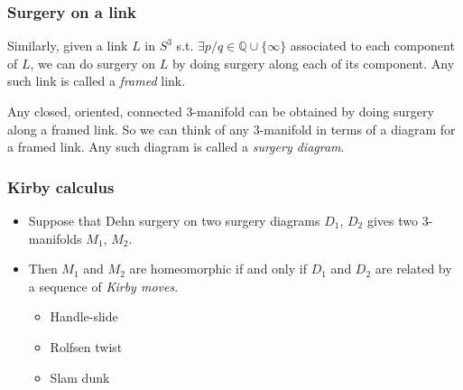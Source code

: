 \documentclass{beamer}
\theoremstyle{ex}
\theoremstyle{rem}
\begin{document}
	

	\begin{frame}
	\frametitle{Surgery on a link}
		\begin{definition}
		Similarly, given a link $L$ in $S^3$ s.t. $\exists p/q \in \mathbb{Q}\cup\{\infty\}$ associated to each component of $L$, we can do surgery on $L$ by doing surgery along each of its component. Any such link is called a \textit{framed} link. 
		\end{definition}
	
	
		\begin{theorem}
		Any closed, oriented, connected $3$-manifold can be obtained by doing surgery along a framed link. So we can think of any $3$-manifold in terms of a diagram for a framed link. Any such diagram is called a \textit{surgery diagram}. 
		\end{theorem}
		
	\end{frame}

	

	

	
	
	\begin{frame}
		\frametitle{Kirby calculus}
		\begin{itemize}
			\item Suppose that Dehn surgery on two surgery diagrams $D_1$, $D_2$ gives two $3$-manifolds $M_1$, $M_2$.
			\pause
			\item Then $M_1$ and $M_2$ are homeomorphic if and only if $D_1$ and $D_2$ are related by a sequence of \textit{Kirby moves}.
			\pause
			\begin{itemize}
				\item Handle-slide
				\pause
				\item Rolfsen twist
				\pause
				\item Slam dunk
			\end{itemize}
		\end{itemize}
	\end{frame}
	
\end{document}
